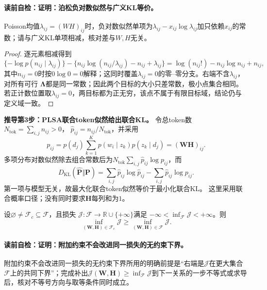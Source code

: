 \paragraph{读前自检：证明：泊松负对数似然与广义KL等价。}Poisson均值$\lambda_{ij}=(WH)_{ij}$时，负对数似然单项为$\lambda_{ij}-x_{ij}\log\lambda_{ij}$加只依赖$x_{ij}$的常数；请与广义KL单项相减，核对差与$W,H$无关。\par

\begin{proof}
逐元素相减得到
\[
\{-\log p(n_{ij}\mid\lambda_{ij})\}
-\{n_{ij}\log(n_{ij}/\lambda_{ij})-n_{ij}+\lambda_{ij}\}
=\log(n_{ij}!)-n_{ij}\log n_{ij}+n_{ij},
\]
其中$n_{ij}=0$时按$0\log0=0$解释；这同时覆盖$\lambda_{ij}=0$的零--零分支。右端不含$\lambda_{ij}$，对所有可行
$\boldsymbol\Lambda$都是同一常数；因此两个目标的大小只差常数，极小点集合相同。
若正计数位置取$\lambda_{ij}=0$，两目标都为正无穷，该点不属于有限目标域，结论仍与定义域一致。
\end{proof}

\textbf{推导第3步：PLSA联合token似然给出联合KL。}
令总token数$N_{\mathrm{tok}}=\sum_{i,j}n_{ij}>0$，
$\widehat p_{ij}=n_{ij}/N_{\mathrm{tok}}$，并采用
\[
p_{ij}=p(d_j)\sum_{k=1}^Kp(w_i\mid z_k)p(z_k\mid d_j)
=(\boldsymbol W\boldsymbol H)_{ij}.
\]
多项分布对数似然除去组合常数后为$N_{\mathrm{tok}}\sum_{i,j}\widehat p_{ij}\log p_{ij}$，而
\[
D_{\mathrm{KL}}(\widehat{\boldsymbol P}\Vert\boldsymbol P)
=\sum_{i,j}\widehat p_{ij}\log\widehat p_{ij}
-\sum_{i,j}\widehat p_{ij}\log p_{ij}.
\]
第一项与模型无关，故最大化联合token似然等价于最小化联合KL。
这里采用联合概率口径；没有同时要求$\boldsymbol H$每列和为$1$。

\begin{proposition}[附加约束不会改进同一损失的无约束下界]\label{prop:V5-C08-feasible-inclusion}
设$\varnothing\ne\mathcal F_c\subseteq\mathcal F$，且损失
$\mathcal J:\mathcal F\to\mathbb R\cup\{+\infty\}$满足
$-\infty<\inf_{\mathcal F}\mathcal J<+\infty$。则
\[
\inf_{(\boldsymbol W,\boldsymbol H)\in\mathcal F_c}\mathcal J
\ge
\inf_{(\boldsymbol W,\boldsymbol H)\in\mathcal F}\mathcal J.
\]
\end{proposition}
\paragraph{读前自检：证明：附加约束不会改进同一损失的无约束下界。}附加约束不会改进同一损失的无约束下界所用的明确前提是“右端是$\mathcal J$在更大集合$\mathcal F$上的共同下界”；完成补出$\mathcal J(\boldsymbol W,\boldsymbol H)\ge\inf_{\mathcal F}\mathcal J$到下一关系的一步不等式或求导后，核对不等号方向与取等条件同时成立。\par

